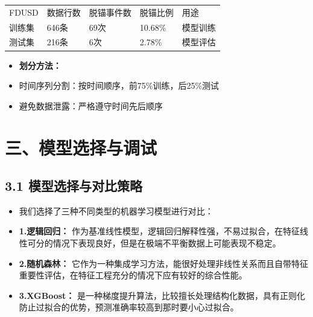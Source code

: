 \documentclass[
  letterpaper,
  DIV=11,
  numbers=noendperiod]{scrartcl}
\providecommand{\tightlist}{%
  \setlength{\itemsep}{0pt}\setlength{\parskip}{0pt}}
\begin{document}
\begin{longtable}[]{@{}lllll@{}}
\toprule\noalign{}
\endhead
\bottomrule\noalign{}
\endlastfoot
FDUSD & 数据行数 & 脱锚事件数 & 脱锚比例 & 用途 \\
训练集 & 646条 & 69次 & 10.68\% & 模型训练 \\
测试集 & 216条 & 6次 & 2.78\% & 模型评估 \\
\end{longtable}

\begin{itemize}
\tightlist
\item
  \textbf{划分方法：}
\item
  时间序列分割：按时间顺序，前75\%训练，后25\%测试
\item
  避免数据泄露：严格遵守时间先后顺序
\end{itemize}

\section{三、模型选择与调试}\label{ux4e09ux6a21ux578bux9009ux62e9ux4e0eux8c03ux8bd5}

\subsection{3.1
模型选择与对比策略}\label{ux6a21ux578bux9009ux62e9ux4e0eux5bf9ux6bd4ux7b56ux7565}

\begin{itemize}
\item
  我们选择了三种不同类型的机器学习模型进行对比：
\item
  \textbf{1.逻辑回归：}
  作为基准线性模型，逻辑回归解释性强，不易过拟合，在特征线性可分的情况下表现良好，但是在极端不平衡数据上可能表现不稳定。
\item
  \textbf{2.随机森林：}
  它作为一种集成学习方法，能很好处理非线性关系而且自带特征重要性评估，在特征工程充分的情况下应有较好的综合性能。
\item
  \textbf{3.XGBoost：}
  是一种梯度提升算法，比较擅长处理结构化数据，具有正则化防止过拟合的优势，预测准确率较高到那时要小心过拟合。
\end{itemize}
\end{document}
